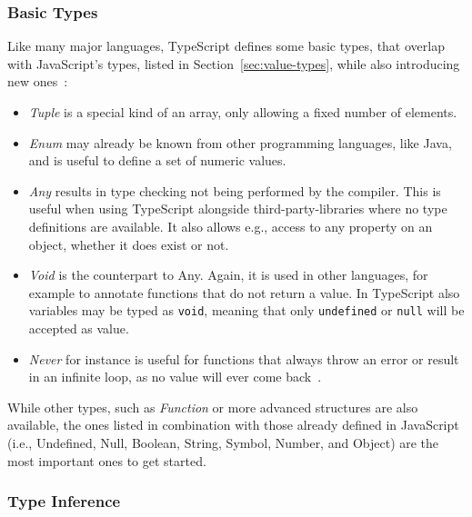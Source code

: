 \subsubsection{Basic Types}
\label{sec:ts-basic-types}

Like many major languages, TypeScript defines some basic types, that overlap with JavaScript's types, listed in Section~\ref{sec:value-types}, while also introducing new ones~\cite{TypeScriptHandbook:BasicTypes}:
\begin{itemize}
  \item \emph{Tuple} is a special kind of an array, only allowing a fixed number of elements.
  \item \emph{Enum} may already be known from other programming languages, like Java, and is useful to define a set of numeric values.
  \item \emph{Any} results in type checking not being performed by the compiler. This is useful when using TypeScript alongside third-party-libraries where no type definitions are available. It also allows e.g., access to any property on an object, whether it does exist or not.
  \item \emph{Void} is the counterpart to Any. Again, it is used in other languages, for example to annotate functions that do not return a value. In TypeScript also variables may be typed as \texttt{void}, meaning that only \texttt{undefined} or \texttt{null} will be accepted as value.
  \item \emph{Never} for instance is useful for functions that always throw an error or result in an infinite loop, as no value will ever come back~\cite{TypeScriptHandbook:BasicTypes}.
\end{itemize}
While other types, such as \emph{Function} or more advanced structures are also available, the ones listed in combination with those already defined in JavaScript (i.e., Undefined, Null, Boolean, String, Symbol, Number, and Object) are the most important ones to get started.

\subsubsection{Type Inference}
\label{sec:ts-type-inference}

